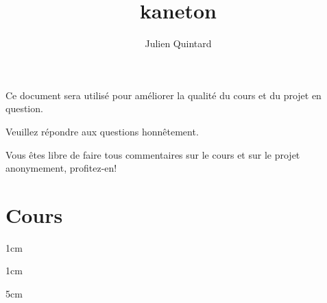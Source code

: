 
%
%



%
%


%
%

\title{kaneton}

%
%

\author{\small{Julien Quintard}}

%
%



%
%

\maketitle

%
%

\begin{center}

\scriptsize{Ce document sera utilis\'e pour am\'eliorer la qualit\'e du
  cours et du projet en question.}

\scriptsize{Veuillez r\'epondre aux questions honn\^etement.}

\scriptsize{Vous \^etes libre de faire tous commentaires sur le cours
  et sur le projet anonymement, profitez-en!}

\end{center}

%
%

%
%

\section{Cours}

         {1cm}

         {1cm}

         {5cm}

